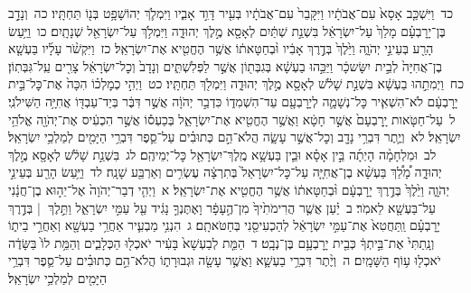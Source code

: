 \documentclass[18pt]{article}
\begin{document}
 {\loc כד~}וַיִּשְׁכַּ֤ב אָסָא֙ עִם־אֲבֹתָ֔יו וַיִּקָּבֵר֙ עִם־אֲבֹתָ֔יו בְּעִ֖יר דָּוִ֣ד אָבִ֑יו וַיִּמְלֹ֛ךְ יְהוֹשָׁפָ֥ט בְּנ֖וֹ תַּחְתָּֽיו׃ \startlock
 {\loc כה~}וְנָדָ֣ב בֶּן־יָרׇבְעָ֗ם מָלַךְ֙ עַל־יִשְׂרָאֵ֔ל בִּשְׁנַ֣ת שְׁתַּ֔יִם לְאָסָ֖א מֶ֣לֶךְ יְהוּדָ֑ה וַיִּמְלֹ֥ךְ עַל־יִשְׂרָאֵ֖ל שְׁנָתָֽיִם׃ \startlock
 {\loc כו~}וַיַּ֥עַשׂ הָרַ֖ע בְּעֵינֵ֣י יְהֹוָ֑ה וַיֵּ֙לֶךְ֙ בְּדֶ֣רֶךְ אָבִ֔יו וּ֨בְחַטָּאת֔וֹ אֲשֶׁ֥ר הֶחֱטִ֖יא אֶת־יִשְׂרָאֵֽל׃ \startlock
 {\loc כז~}וַיִּקְשֹׁ֨ר עָלָ֜יו בַּעְשָׁ֤א בֶן־אֲחִיָּה֙ לְבֵ֣ית יִשָּׂשכָ֔ר וַיַּכֵּ֣הוּ בַעְשָׁ֔א בְּגִבְּת֖וֹן אֲשֶׁ֣ר לַפְּלִשְׁתִּ֑ים וְנָדָב֙ וְכׇל־יִשְׂרָאֵ֔ל צָרִ֖ים עַֽל־גִּבְּתֽוֹן׃ \startlock
 {\loc כח~}וַיְמִתֵ֣הוּ בַעְשָׁ֔א בִּשְׁנַ֣ת שָׁלֹ֔שׁ לְאָסָ֖א מֶ֣לֶךְ יְהוּדָ֑ה וַיִּמְלֹ֖ךְ תַּחְתָּֽיו׃ \startlock
 {\loc כט~}וַיְהִ֣י כְמׇלְכ֗וֹ הִכָּה֙ אֶת־כׇּל־בֵּ֣ית יָרׇבְעָ֔ם לֹא־הִשְׁאִ֧יר כׇּל־נְשָׁמָ֛ה לְיָרׇבְעָ֖ם עַד־הִשְׁמִד֑וֹ כִּדְבַ֣ר יְהֹוָ֔ה אֲשֶׁ֣ר דִּבֶּ֔ר בְּיַד־עַבְדּ֖וֹ אֲחִיָּ֥ה הַשִּׁילֹנִֽי׃ \startlock
 {\loc ל~}עַל־חַטֹּ֤אות יָֽרׇבְעָם֙ אֲשֶׁ֣ר חָטָ֔א וַאֲשֶׁ֥ר הֶחֱטִ֖יא אֶת־יִשְׂרָאֵ֑ל בְּכַעְס֕וֹ אֲשֶׁ֣ר הִכְעִ֔יס אֶת־יְהֹוָ֖ה אֱלֹהֵ֥י יִשְׂרָאֵֽל׃ \startlock
 {\loc לא~}וְיֶ֛תֶר דִּבְרֵ֥י נָדָ֖ב וְכׇל־אֲשֶׁ֣ר עָשָׂ֑ה הֲלֹא־הֵ֣ם כְּתוּבִ֗ים עַל־סֵ֛פֶר דִּבְרֵ֥י הַיָּמִ֖ים לְמַלְכֵ֥י יִשְׂרָאֵֽל׃ \startlock
 {\loc לב~}וּמִלְחָמָ֨ה הָיְתָ֜ה בֵּ֣ין אָסָ֗א וּבֵ֛ין בַּעְשָׁ֥א מֶֽלֶךְ־יִשְׂרָאֵ֖ל כׇּל־יְמֵיהֶֽם׃ \startlock
 {\loc לג~}בִּשְׁנַ֣ת שָׁלֹ֔שׁ לְאָסָ֖א מֶ֣לֶךְ יְהוּדָ֑ה מָ֠לַ֠ךְ בַּעְשָׁ֨א בֶן־אֲחִיָּ֤ה עַל־כׇּל־יִשְׂרָאֵל֙ בְּתִרְצָ֔ה עֶשְׂרִ֥ים וְאַרְבַּ֖ע שָׁנָֽה׃ \startlock
 {\loc לד~}וַיַּ֥עַשׂ הָרַ֖ע בְּעֵינֵ֣י יְהֹוָ֑ה וַיֵּ֙לֶךְ֙ בְּדֶ֣רֶךְ יָרׇבְעָ֔ם וּ֨בְחַטָּאת֔וֹ אֲשֶׁ֥ר הֶחֱטִ֖יא אֶת־יִשְׂרָאֵֽל׃ 
\startlock
 {\loc א~}וַיְהִ֤י דְבַר־יְהֹוָה֙ אֶל־יֵה֣וּא בֶן־חֲנָ֔נִי עַל־בַּעְשָׁ֖א לֵאמֹֽר׃ \startlock
 {\loc ב~}יַ֗עַן אֲשֶׁ֤ר הֲרִימֹתִ֙יךָ֙ מִן־הֶ֣עָפָ֔ר וָאֶתֶּנְךָ֣ נָגִ֔יד עַ֖ל עַמִּ֣י יִשְׂרָאֵ֑ל וַתֵּ֣לֶךְ  |  בְּדֶ֣רֶךְ יָרׇבְעָ֗ם וַֽתַּחֲטִא֙ אֶת־עַמִּ֣י יִשְׂרָאֵ֔ל לְהַכְעִיסֵ֖נִי בְּחַטֹּאתָֽם׃ \startlock
 {\loc ג~}הִנְנִ֥י מַבְעִ֛יר אַחֲרֵ֥י בַעְשָׁ֖א וְאַחֲרֵ֣י בֵית֑וֹ וְנָֽתַתִּי֙ אֶת־בֵּ֣יתְךָ֔ כְּבֵ֖ית יָרׇבְעָ֥ם בֶּן־נְבָֽט׃ \startlock
 {\loc ד~}הַמֵּ֤ת לְבַעְשָׁא֙ בָּעִ֔יר יֹאכְל֖וּ הַכְּלָבִ֑ים וְהַמֵּ֥ת לוֹ֙ בַּשָּׂדֶ֔ה יֹאכְל֖וּ ע֥וֹף הַשָּׁמָֽיִם׃ \startlock
 {\loc ה~}וְיֶ֨תֶר דִּבְרֵ֥י בַעְשָׁ֛א וַאֲשֶׁ֥ר עָשָׂ֖ה וּגְבוּרָת֑וֹ הֲלֹא־הֵ֣ם כְּתוּבִ֗ים עַל־סֵ֛פֶר דִּבְרֵ֥י הַיָּמִ֖ים לְמַלְכֵ֥י יִשְׂרָאֵֽל׃ \startlock
\end{document}
